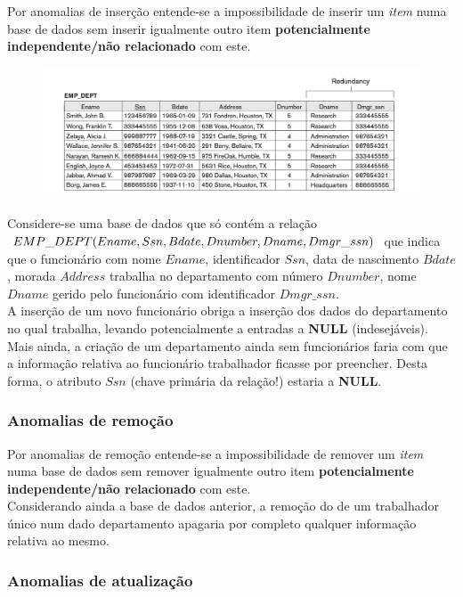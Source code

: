 \documentclass[oneside]{book}
\theoremstyle{definition}
\begin{document}
Por anomalias de inserção entende-se a impossibilidade de inserir um \textit{item} numa base de dados sem inserir igualmente outro item \textbf{potencialmente independente/não relacionado} com este.
\vspace{-0.3em}
\begin{figure}[H]
    \centering
    \includegraphics[scale = 0.6]{cap_norm/tabela_redundancia.png}
\end{figure}

Considere-se uma base de dados que só contém a relação $EMP\_DEPT(Ename, Ssn, Bdate, Dnumber, Dname, \\ Dmgr\_ssn)$ que indica que o funcionário com nome $Ename$, identificador $Ssn$, data de nascimento $Bdate$, morada $Address$ trabalha no departamento com número $Dnumber$, nome $Dname$ gerido pelo funcionário com identificador $Dmgr\_ssn$.\\
A inserção de um novo funcionário obriga a inserção dos dados do departamento no qual trabalha, levando potencialmente a entradas a \textbf{NULL} (indesejáveis). Mais ainda, a criação de um departamento ainda sem funcionários faria com que a informação relativa ao funcionário trabalhador ficasse por preencher. Desta forma, o atributo $Ssn$ (chave primária da relação!) estaria a \textbf{NULL}.

\subsubsection*{Anomalias de remoção}

Por anomalias de remoção entende-se a impossibilidade de remover um \textit{item} numa base de dados sem remover igualmente outro item \textbf{potencialmente independente/não relacionado} com este. \\

Considerando ainda a base de dados anterior, a remoção do de um trabalhador único num dado departamento apagaria por completo qualquer informação relativa ao mesmo.

\subsubsection*{Anomalias de atualização}
\end{document}
